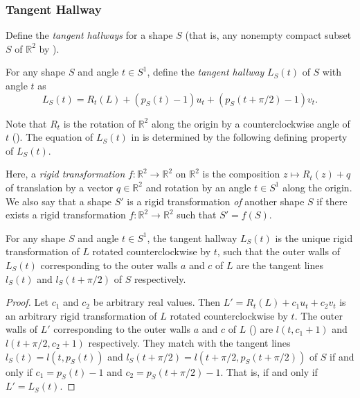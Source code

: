 \subsubsection{Tangent Hallway}

Define the \emph{tangent hallways} for a shape \(S\) (that is, any nonempty compact subset \(S\) of \(\mathbb{R}^2\) by ).

\begin{definition}

For any shape \(S\) and angle \(t \in S^1\), define the \emph{tangent hallway} \(L_S(t)\) of \(S\) with angle \(t\) as
\[
L_S(t) = R_t(L) + (p_S(t) - 1)  u_t + (p_S(t + \pi/2) - 1) v_t.
\]

\label{def:tangent-hallway}
\end{definition}

Note that \(R_t\) is the rotation of \(\mathbb{R}^2\) along the origin by a counterclockwise angle of \(t\) (). The equation of \(L_S(t)\) in  is determined by the following defining property of \(L_S(t)\).

\begin{definition}

Here, a \emph{rigid transformation} \(f : \mathbb{R}^2 \to \mathbb{R}^2\) on \(\mathbb{R}^2\) is the composition \(z \mapsto R_t(z) + q\) of translation by a vector \(q \in \mathbb{R}^2\) and rotation by an angle \(t \in S^1\) along the origin. We also say that a shape \(S'\) is a rigid transformation \emph{of} another shape \(S\) if there exists a rigid transformation \(f : \mathbb{R}^2 \to \mathbb{R}^2\) such that \(S' = f(S)\).

\label{def:rigid-transformation}
\end{definition}

\begin{proposition}

For any shape \(S\) and angle \(t \in S^1\), the tangent hallway \(L_S(t)\) is the unique rigid transformation of \(L\) rotated counterclockwise by \(t\), such that the outer walls of \(L_S(t)\) corresponding to the outer walls \(a\) and \(c\) of \(L\) are the tangent lines \(l_S(t)\) and \(l_S(t + \pi/2)\) of \(S\) respectively.

\label{pro:tangent-hallway}
\end{proposition}

\begin{proof}
Let \(c_1\) and \(c_2\) be arbitrary real values. Then \(L' = R_t(L) + c_1 u_t + c_2 v_t\) is an arbitrary rigid transformation of \(L\) rotated counterclockwise by \(t\). The outer walls of \(L'\) corresponding to the outer walls \(a\) and \(c\) of \(L\) () are \(l(t, c_1 + 1)\) and \(l(t + \pi/2, c_2 + 1)\) respectively. They match with the tangent lines \(l_S(t) = l(t, p_S(t))\) and \(l_S(t + \pi/2) = l(t + \pi/2, p_S(t + \pi/2))\) of \(S\) if and only if \(c_1 = p_S(t) - 1\) and \(c_2 = p_S(t + \pi/2) - 1\). That is, if and only if \(L' = L_S(t)\).
\end{proof}

